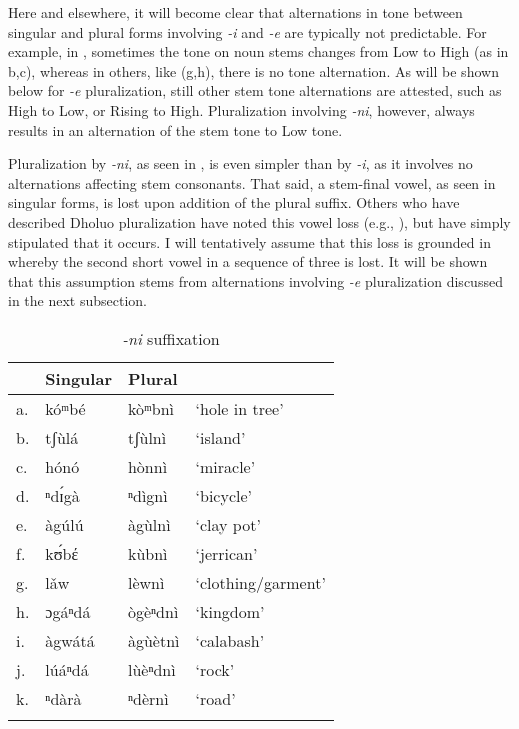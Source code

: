 \documentclass[output=paper,colorlinks,citecolor=brown]{langscibook}
\begin{document}
Here and elsewhere, it will become clear that alternations in tone between singular and plural forms involving \textit{-i} and \textit{-e} are typically not predictable. For example, in , sometimes the tone on noun stems changes from Low to High (as in b,c), whereas in others, like (g,h), there is no tone alternation. As will be shown below for \textit{-e} pluralization, still other stem tone alternations are attested, such as High to Low, or Rising to High. Pluralization involving \textit{-ni}, however, always results in an alternation of the  stem tone to Low tone.

Pluralization by \textit{-ni}, as seen in , is even simpler than by \textit{-i}, as it involves no alternations affecting stem consonants. That said, a stem-final vowel, as seen in singular forms, is lost upon addition of the plural suffix. Others who have described Dholuo pluralization have noted this vowel loss (e.g., \citealt{Gregersen1961, Okoth-Okombo1982}), but have simply stipulated that it occurs. I will tentatively assume that this loss is grounded in  whereby the second short vowel in a sequence of three is lost. It will be shown that this assumption stems from alternations involving \textit{-e} pluralization discussed in the next subsection.

\begin{table}
\caption{\textit{-ni} suffixation}
\label{tab:NiSuffixation}
 \begin{tabular}{llll}
  \lsptoprule
& Singular & Plural &  \\
\midrule
a.	&kóᵐbé&	kòᵐbnì&	`hole in tree'\\
b.&	tʃùlá&	tʃùlnì&	`island'\\
c.&	hónó&	hònnì&	`miracle'\\
d.&	ⁿdɪ́gà &	ⁿdìgnì&	`bicycle'\\
e.&	àgúlú&	àgùlnì&	`clay pot'\\
f.&	kʊ́bέ&	kùbnì	&`jerrican'\\
g.&	lǎw&	lèwnì&	`clothing/garment'\\
h.&	ɔgáⁿdá	&ògèⁿdnì	&`kingdom'\\
i.&	àgwátá&	àgùètnì&	`calabash'\\
j.&	lúáⁿdá&	lùèⁿdnì&	`rock'\\
k.&	ⁿdàrà	&ⁿdèrnì&	`road'\\
  \lspbottomrule
 \end{tabular}
\end{table}   
\end{document}
